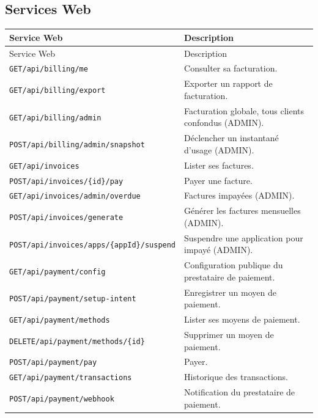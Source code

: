 \subsection{Services Web}
{\setlength{\tabcolsep}{8pt}
\begin{longtable}{|p{5.8cm}|p{8.4cm}|}
\hline
Service Web & Description \\
\hline
\endfirsthead
\hline
Service Web & Description \\
\hline
\endhead
\endfoot
\hline
\endlastfoot
\texttt{GET\slash api\slash billing\slash me} & Consulter sa facturation. \\ \hline
\texttt{GET\slash api\slash billing\slash export} & Exporter un rapport de facturation. \\ \hline
\texttt{GET\slash api\slash billing\slash admin} & Facturation globale, tous clients confondus (ADMIN). \\ \hline
\texttt{POST\slash api\slash billing\slash admin\slash snapshot} & Déclencher un instantané d'usage (ADMIN). \\ \hline
\texttt{GET\slash api\slash invoices} & Lister ses factures. \\ \hline
\texttt{POST\slash api\slash invoices\slash\{id\}\slash pay} & Payer une facture. \\ \hline
\texttt{GET\slash api\slash invoices\slash admin\slash overdue} & Factures impayées (ADMIN). \\ \hline
\texttt{POST\slash api\slash invoices\slash generate} & Générer les factures mensuelles (ADMIN). \\ \hline
\texttt{POST\slash api\slash invoices\slash apps\slash\{appId\}\slash suspend} & Suspendre une application pour impayé (ADMIN). \\ \hline
\texttt{GET\slash api\slash payment\slash config} & Configuration publique du prestataire de paiement. \\ \hline
\texttt{POST\slash api\slash payment\slash setup-intent} & Enregistrer un moyen de paiement. \\ \hline
\texttt{GET\slash api\slash payment\slash methods} & Lister ses moyens de paiement. \\ \hline
\texttt{DELETE\slash api\slash payment\slash methods\slash\{id\}} & Supprimer un moyen de paiement. \\ \hline
\texttt{POST\slash api\slash payment\slash pay} & Payer. \\ \hline
\texttt{GET\slash api\slash payment\slash transactions} & Historique des transactions. \\ \hline
\texttt{POST\slash api\slash payment\slash webhook} & Notification du prestataire de paiement. \\ \hline
\end{longtable}}


